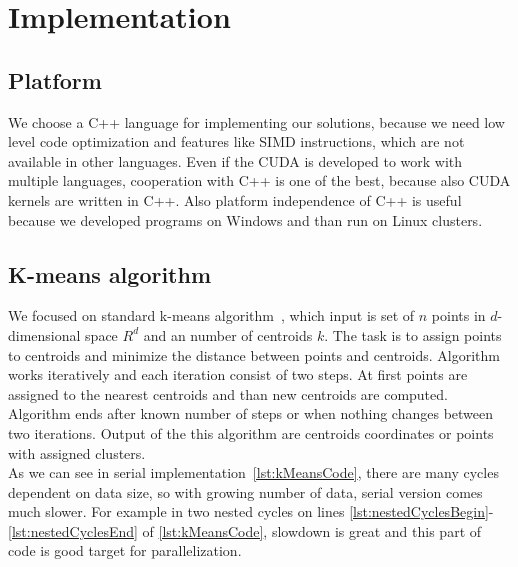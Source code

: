 \chapter{Implementation}
\section{Platform}
We choose a C++ language for implementing our solutions, because we need low level code optimization and features like SIMD instructions, which are not available in other languages. Even if the CUDA is developed to work with multiple languages, cooperation with  C++ is one of the best, because also CUDA kernels are written in C++. Also platform independence of C++ is useful because we developed programs on Windows and than run on Linux clusters.

\section{K-means algorithm} \label{sec:kMeansAlgorithm}
We focused on standard k-means algorithm~\cite{hartigan1979algorithm}, which input is set of $n$ points in $d$-dimensional space $R^d$ and an number of centroids $k$. The task is to assign points to centroids and minimize the distance between points and centroids. Algorithm works iteratively and each iteration consist of two steps. At first points are assigned to the nearest centroids and than new centroids are computed. Algorithm ends after known number of steps or when nothing changes between two iterations. Output of the this algorithm are centroids coordinates or points with assigned clusters.\\
As we can see in serial implementation~\autoref{lst:kMeansCode}, there are many cycles dependent on data size, so with growing number of data, serial version comes much slower. For example in two nested cycles on lines \autoref{lst:nestedCyclesBegin}-\autoref{lst:nestedCyclesEnd} of \autoref{lst:kMeansCode}, slowdown is great and this part of code is good target for parallelization.\\

